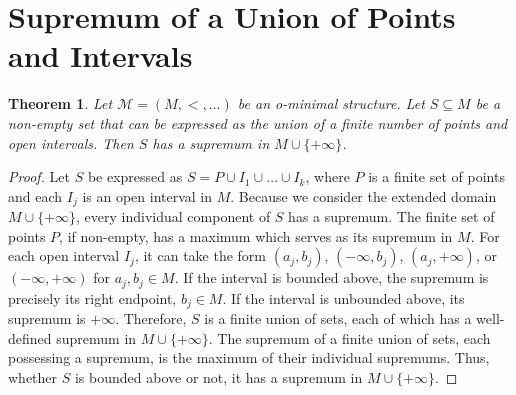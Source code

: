 \documentclass[12pt]{article}
\newtheorem{theorem}{Theorem}
\begin{document}
\section{Supremum of a Union of Points and Intervals}
\begin{theorem}
Let $\mathcal{M} = (M, <, \dots)$ be an o-minimal structure.
Let $S \subseteq M$ be a non-empty set that can be expressed as the union of a finite number of points and open intervals.
Then $S$ has a supremum in $M \cup \{+\infty\}$.
\end{theorem}
\begin{proof}
Let $S$ be expressed as $S = P \cup I_1 \cup \dots \cup I_k$, where $P$ is a finite set of points and each $I_j$ is an open interval in $M$.
Because we consider the extended domain $M \cup \{+\infty\}$, every individual component of $S$ has a supremum.
The finite set of points $P$, if non-empty, has a maximum which serves as its supremum in $M$.
For each open interval $I_j$, it can take the form $(a_j, b_j)$, $(-\infty, b_j)$, $(a_j, +\infty)$, or $(-\infty, +\infty)$ for $a_j, b_j \in M$.
If the interval is bounded above, the supremum is precisely its right endpoint, $b_j \in M$. If the interval is unbounded above, its supremum is $+\infty$.
Therefore, $S$ is a finite union of sets, each of which has a well-defined supremum in $M \cup \{+\infty\}$.
The supremum of a finite union of sets, each possessing a supremum, is the maximum of their individual supremums.
Thus, whether $S$ is bounded above or not, it has a supremum in $M \cup \{+\infty\}$.
\end{proof}
\end{document}
